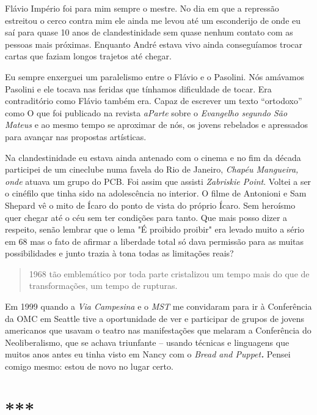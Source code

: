 Flávio Império foi para mim sempre o mestre. No dia em que a repressão
estreitou o cerco contra mim ele ainda me levou até um esconderijo de
onde eu saí para quase 10 anos de clandestinidade sem quase nenhum
contato com as pessoas mais próximas. Enquanto André estava vivo ainda
conseguíamos trocar cartas que faziam longos trajetos até chegar.

Eu sempre enxerguei um paralelismo entre o Flávio e o Pasolini. Nós
amávamos Pasolini e ele tocava nas feridas que tínhamos dificuldade de
tocar. Era contraditório como Flávio também era. Capaz de escrever um
texto “ortodoxo” como O que foi publicado na revista \textit{aParte} sobre
o \textit{Evangelho segundo São Mateus} e ao mesmo tempo se aproximar de
nós, os jovens rebelados e apressados para avançar nas propostas
artísticas.

Na clandestinidade eu estava ainda antenado com o cinema e no fim da
década participei de um cineclube numa favela do Rio de Janeiro,
\textit{Chapéu Mangueira, onde} atuava um grupo do PCB. Foi assim que
assisti \textit{Zabriskie Point}. Voltei a ser o cinéfilo que tinha sido na
adolescência no interior. O filme de Antonioni e Sam Shepard vê o mito
de Ícaro do ponto de vista do próprio Ícaro. Sem heroísmo quer chegar
até o céu sem ter condições para tanto. Que mais posso dizer a respeito,
senão lembrar que o lema "É proibido proibir" era levado muito a sério
em 68 mas o fato de afirmar a liberdade total só dava permissão para as
muitas possibilidades e junto trazia à tona todas as limitações reais?

\begin{quote}
1968 tão emblemático por toda parte cristalizou um tempo mais do que de
transformações, um tempo de rupturas.
\end{quote}

Em 1999 quando a \textit{Via Campesina} e o \textit{MST} me convidaram para ir
à Conferência da OMC em Seattle tive a oportunidade de ver e participar
de grupos de jovens americanos que usavam o teatro nas manifestações que
melaram a Conferência do Neoliberalismo, que se achava triunfante --
usando técnicas e linguagens que muitos anos antes eu tinha visto em
Nancy com o \textit{Bread and Puppet\textbf{. }}Pensei comigo mesmo: estou de
novo no lugar certo.

\section{***}

